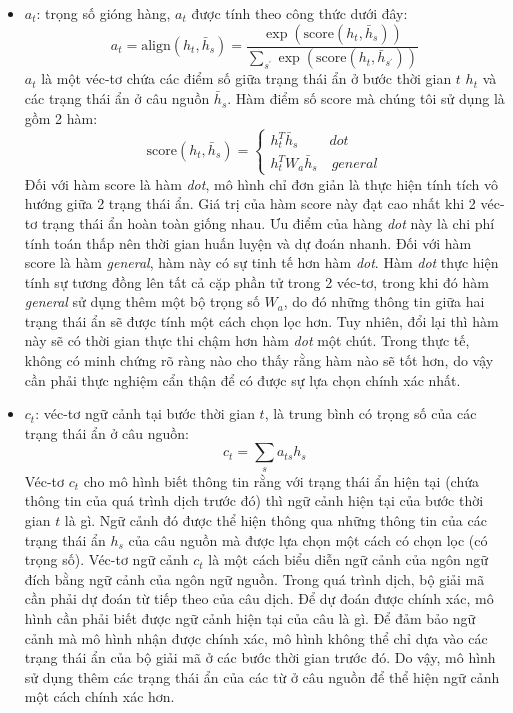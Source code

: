 \begin{itemize}
	\item $a_t$: trọng số gióng hàng, $a_t$ được tính theo công thức dưới đây:
	\begin{equation}
	a_t = \text{align}(h_t, \bar{h}_s) = \frac{\exp\left(\text{score}(h_t, \bar{h}_s)\right)}{\sum_{s^{'}}\exp\left(\text{score}(h_t, \bar{h}_{s^{'}})\right)}
	\end{equation}
	$a_t$ là một véc-tơ chứa các điểm số giữa trạng thái ẩn ở bước thời gian $t$ $h_t$ và các trạng thái ẩn ở câu nguồn $\bar{h}_s$. Hàm điểm số score mà chúng tôi sử dụng là gồm 2 hàm:
	\begin{equation}
	\text{score}(h_t, \bar{h}_s) = \left\{
			\begin{array}{ll}
			h^T_t\bar{h}_s \ \quad\quad dot\\
			h^T_tW_a\bar{h}_s	\quad general
			\end{array}
		\right.
	\end{equation}
	Đối với hàm score là hàm \textit{dot}, mô hình chỉ đơn giản là thực hiện tính tích vô hướng giữa 2 trạng thái ẩn. Giá trị của hàm score này đạt cao nhất khi 2 véc-tơ trạng thái ẩn hoàn toàn giống nhau. Ưu điểm của hàng \textit{dot} này là chi phí tính toán thấp nên thời gian huấn luyện và dự đoán nhanh.
	Đối với hàm score là hàm \textit{general}, hàm này có sự tinh tế hơn hàm \textit{dot}. Hàm \textit{dot} thực hiện tính sự tương đồng lên tất cả cặp phần tử trong 2 véc-tơ, trong khi đó hàm \textit{general} sử dụng thêm một bộ trọng số $W_a$, do đó những thông tin giữa hai trạng thái ẩn sẽ được tính một cách chọn lọc hơn. Tuy nhiên, đổi lại thì hàm này sẽ có thời gian thực thi chậm hơn hàm \textit{dot} một chút. Trong thực tế, không có minh chứng rõ ràng nào cho thấy rằng hàm nào sẽ tốt hơn, do vậy cần phải thực nghiệm cẩn thận để có được sự lựa chọn chính xác nhất.
	\item $c_t$: véc-tơ ngữ cảnh tại bước thời gian $t$, là trung bình có trọng số của các trạng thái ẩn ở câu nguồn:
	\begin{equation}
	c_t = \sum_{s}a_{ts}h_s
	\end{equation}
	Véc-tơ $c_t$ cho mô hình biết thông tin rằng với trạng thái ẩn hiện tại (chứa thông tin của quá trình dịch trước đó) thì ngữ cảnh hiện tại của bước thời gian $t$ là gì. Ngữ cảnh đó được thể hiện thông qua những thông tin của các trạng thái ẩn $h_s$ của câu nguồn mà được lựa chọn một cách có chọn lọc (có trọng số). Véc-tơ ngữ cảnh $c_t$ là một cách biểu diễn ngữ cảnh của ngôn ngữ đích bằng ngữ cảnh của ngôn ngữ nguồn. Trong quá trình dịch, bộ giải mã cần phải dự đoán từ tiếp theo của câu dịch. Để dự đoán được chính xác, mô hình cần phải biết được ngữ cảnh hiện tại của câu là gì. Để đảm bảo ngữ cảnh mà mô hình nhận được chính xác, mô hình không thể chỉ dựa vào các trạng thái ẩn của bộ giải mã ở các bước thời gian trước đó. Do vậy, mô hình sử dụng thêm các trạng thái ẩn của các từ ở câu nguồn để thể hiện ngữ cảnh một cách chính xác hơn.

\end{itemize}
